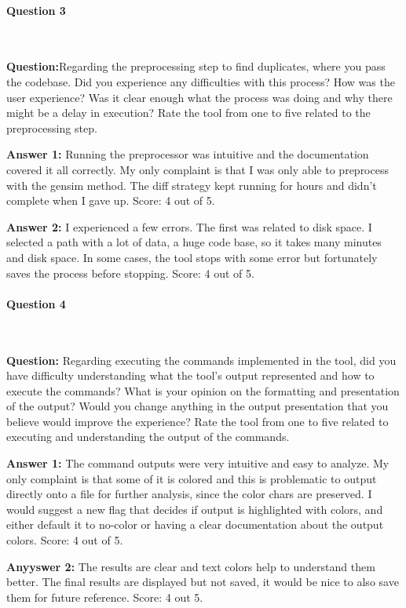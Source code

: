 \paragraph{Question 3}

\

\textbf{Question:}Regarding the preprocessing step to find duplicates, where you pass the codebase. 
Did you experience any difficulties with this process? How was the user experience? 
Was it clear enough what the process was doing and why there might be a delay in execution?
Rate the tool  from one to five related to the preprocessing step.

\textbf{Answer 1:} Running the preprocessor was intuitive and the documentation covered 
it all correctly. My only complaint is that I was only able to preprocess with the gensim method. 
The diff strategy kept running for hours and didn't complete when I gave up. Score: 4 out of 5.

\textbf{Answer 2:} I experienced a few errors. The first was related to disk space. I selected a path with a
lot of data, a huge code base, so it takes many minutes and disk space. In some cases,
the tool stops with some error but fortunately saves the process before stopping.
Score: 4 out of 5.

\paragraph{Question 4}

\

\textbf{Question:} Regarding executing the commands implemented in the tool, did you 
have difficulty understanding what the tool's output represented and how to execute the commands?
What is your opinion on the formatting and presentation of the output? Would you change anything 
in the output presentation that you believe would improve the experience?
Rate the tool  from one to five related to executing and understanding the output of the commands.

\textbf{Answer 1:} The command outputs were very intuitive and easy to analyze. My only complaint 
is that some of it is colored and this is problematic to output directly onto a file for further analysis, 
since the color chars are preserved. I would suggest a new flag that decides if output is highlighted 
with colors, and either default it to no-color or having a clear documentation about the output colors.
Score: 4 out of 5.

\textbf{Anyyswer 2:} The results are clear and text colors help to understand them better. The final results are
displayed but not saved, it would be nice to also save them for future reference. Score: 4 out 5.

